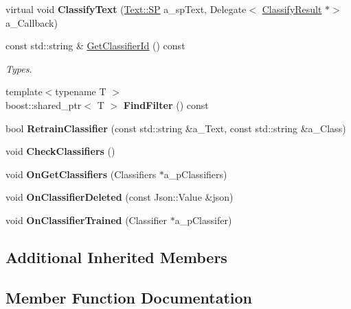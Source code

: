 \begin{DoxyCompactItemize}
virtual void {\bfseries Classify\+Text} (\hyperlink{class_text_a35ce88bdca4f380b865b6066079230b1}{Text\+::\+SP} a\+\_\+sp\+Text, Delegate$<$ \hyperlink{struct_i_text_classifier_proxy_1_1_classify_result}{Classify\+Result} $\ast$$>$ a\+\_\+\+Callback)
\item 
const std\+::string \& \hyperlink{class_n_l_c_proxy_ad05ec13fde19c78b43e52c945512c1d6}{Get\+Classifier\+Id} () const
\begin{DoxyCompactList}\small\item\em Types. \end{DoxyCompactList}\item 
\mbox{\label{class_n_l_c_proxy_a665c41e96da583ff262135f55140ad7a}} 
{\footnotesize template$<$typename T $>$ }\\boost\+::shared\+\_\+ptr$<$ T $>$ {\bfseries Find\+Filter} () const
\item 
\mbox{\label{class_n_l_c_proxy_a0bbae693f4a8ce6dbefd0e5da685c570}} 
bool {\bfseries Retrain\+Classifier} (const std\+::string \&a\+\_\+\+Text, const std\+::string \&a\+\_\+\+Class)
\item 
\mbox{\label{class_n_l_c_proxy_a9a60347e74d94c544a3cdc5b27b5ed20}} 
void {\bfseries Check\+Classifiers} ()
\item 
\mbox{\label{class_n_l_c_proxy_a74214dd6ee81f53ebecd743773017e55}} 
void {\bfseries On\+Get\+Classifiers} (Classifiers $\ast$a\+\_\+p\+Classifiers)
\item 
\mbox{\label{class_n_l_c_proxy_a6bcbb5be7d667e727d932898b6352f41}} 
void {\bfseries On\+Classifier\+Deleted} (const Json\+::\+Value \&json)
\item 
\mbox{\label{class_n_l_c_proxy_adec4319aba763f32674a8a690e499846}} 
void {\bfseries On\+Classifier\+Trained} (Classifier $\ast$a\+\_\+p\+Classifer)
\end{DoxyCompactItemize}
\subsection*{Additional Inherited Members}


\subsection{Member Function Documentation}
\mbox{\label{class_n_l_c_proxy_ad05ec13fde19c78b43e52c945512c1d6}} 
